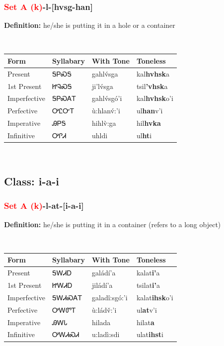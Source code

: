 \subsubsection*{\textcolor{Red}{Set A (k)}{-}\textbf{l}{-}[hvsg-han]}
\nopagebreak
\textbf{Definition: } he/she is putting it in a hole or a container
\\[0.5em]
\begin{tabularx}{\textwidth}{l X X X}%
\toprule%
\textbf{Form}&\textbf{Syllabary}&\textbf{With Tone}&\textbf{Toneless}\\%
\midrule%
Present&ᎦᏢᏍᎦ&gahlv́sga&kal\textbf{hvhsk}a\\%
1st Present&ᏥᎸᏍᎦ&ji’lv́sga&tsil\textbf{'vhsk}a\\%
Imperfective&ᎦᏢᏍᎪᎢ&gahlv́sgó’i&kal\textbf{hvhsk}o'i\\%
Perfective&ᎤᏝᏅᎢ&ù:hlanv́:’i&ul\textbf{han}v'i\\%
Imperative&ᎯᏢᎦ&hihlv̀:ga&hil\textbf{hvka}\\%
Infinitive&ᎤᎵᏗ&uhldi&ul\textbf{ht}i\\%
\bottomrule%
\end{tabularx}
\\[1em]
\needspace{3in}
\subsection*{Class: i-a-i}
\nopagebreak
\needspace{2in}
\subsubsection*{\textcolor{Red}{Set A (k)}{-}\textbf{l}{-}at{-}[i-a-i]}
\nopagebreak
\textbf{Definition: } he/she is putting it in a container (refers to a long object)
\\[0.5em]
\begin{tabularx}{\textwidth}{l X X X}%
\toprule%
\textbf{Form}&\textbf{Syllabary}&\textbf{With Tone}&\textbf{Toneless}\\%
\midrule%
Present&ᎦᎳᏗᎠ&galádí’a&kalat\textbf{i'}a\\%
1st Present&ᏥᎳᏗᎠ&jiládí’a&tsilat\textbf{i'}a\\%
Imperfective&ᎦᎳᏗᏍᎪᎢ&galadî:sgó:’i&kalat\textbf{ihsk}o'i\\%
Perfective&ᎤᎳᏛᎢ&ù:ládv̌:’i&ul\textbf{at}v'i\\%
Imperative&ᎯᎳᏓ&hilada&hilat\textbf{a}\\%
Infinitive&ᎤᎳᏗᏍᏗ&u:ladì:sdi&ulat\textbf{ihst}i\\%
\bottomrule%
\end{tabularx}
\\[1em]
\needspace{3in}
